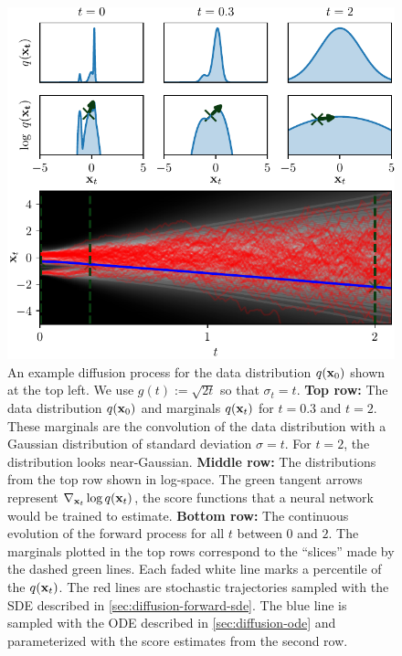 \begin{figure}
    \centering
    \includegraphics[scale=1]{figs/thesis/diffusion_process.pdf}
    \caption{An example diffusion process for the data distribution $q({\mathbf{x}}_0)$ shown at the top left. We use $g(t) := \sqrt{2t}$ so that $\sigma_t = t$. \textbf{Top row:} The data distribution $q({\mathbf{x}}_0)$ and marginals $q({\mathbf{x}}_t)$ for $t=0.3$ and $t=2$. These marginals are the convolution of the data distribution with a Gaussian distribution of standard deviation $\sigma = t$. For $t=2$, the distribution looks near-Gaussian. \textbf{Middle row:} The distributions from the top row shown in log-space. The green tangent arrows represent $\nabla_{{\mathbf{x}}_t} \log q({\mathbf{x}}_t)$, the score functions that a neural network would be trained to estimate. \textbf{Bottom row:} The continuous evolution of the forward process for all $t$ between $0$ and $2$. The marginals plotted in the top rows correspond to the ``slices'' made by the dashed green lines. Each faded white line marks a percentile of the $q({\mathbf{x}}_t)$. The red lines are stochastic trajectories sampled with the SDE described in \cref{sec:diffusion-forward-sde}. The blue line is sampled with the ODE described in \cref{sec:diffusion-ode} and parameterized with the score estimates from the second row.}
    \label{fig:diffusion-overview}
\end{figure}


